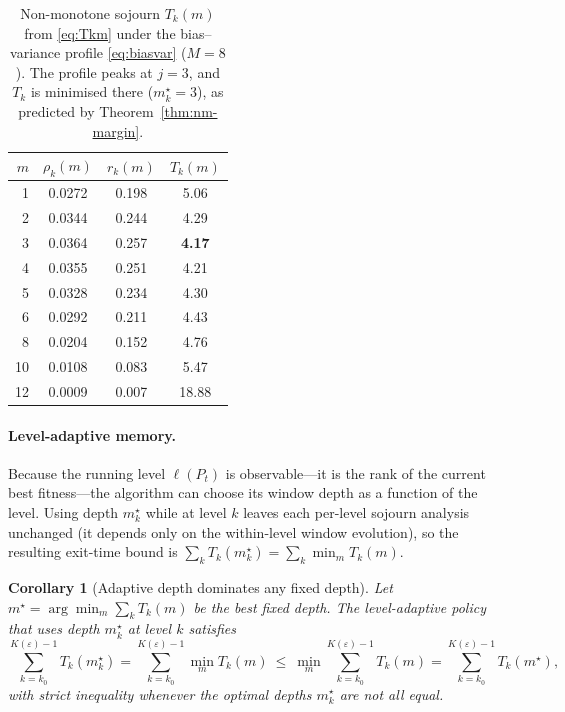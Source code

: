 \documentclass[11pt,a4paper]{article}
\newtheorem{corollary}[theorem]{Corollary}
\begin{document}
\begin{table}[ht]
\centering
\caption{Non-monotone sojourn $T_k(m)$ from \eqref{eq:Tkm} under the
  bias--variance profile \eqref{eq:biasvar} ($M=8$).  The profile peaks
  at $j=3$, and $T_k$ is minimised there ($m_k^\star=3$), as predicted by
  Theorem~\ref{thm:nm-margin}.}
\label{tab:nm-example}
\renewcommand{\arraystretch}{1.2}
\begin{tabular}{@{}rccc@{}}
\toprule
$m$ & $\rho_k(m)$ & $r_k(m)$ & $T_k(m)$ \\
\midrule
1  & 0.0272 & 0.198 & 5.06 \\
2  & 0.0344 & 0.244 & 4.29 \\
3  & 0.0364 & 0.257 & \textbf{4.17} \\
4  & 0.0355 & 0.251 & 4.21 \\
5  & 0.0328 & 0.234 & 4.30 \\
6  & 0.0292 & 0.211 & 4.43 \\
8  & 0.0204 & 0.152 & 4.76 \\
10 & 0.0108 & 0.083 & 5.47 \\
12 & 0.0009 & 0.007 & 18.88 \\
\bottomrule
\end{tabular}
\end{table}

\paragraph{Level-adaptive memory.}

Because the running level $\ell(P_t)$ is observable---it is the rank of
the current best fitness---the algorithm can choose its window depth as
a function of the level.  Using depth $m_k^\star$ while at level $k$
leaves each per-level sojourn analysis unchanged (it depends only on the
within-level window evolution), so the resulting exit-time bound is
$\sum_k T_k(m_k^\star)=\sum_k\min_m T_k(m)$.

\begin{corollary}[Adaptive depth dominates any fixed depth]
\label{cor:nm-adaptive}
  Let $m^\star=\arg\min_m\sum_k T_k(m)$ be the best fixed depth.  The
  level-adaptive policy that uses depth $m_k^\star$ at level $k$ satisfies
  \[
    \sum_{k=k_0}^{K(\varepsilon)-1}T_k(m_k^\star)
    =\sum_{k=k_0}^{K(\varepsilon)-1}\min_{m}T_k(m)
    \ \le\ \min_{m}\sum_{k=k_0}^{K(\varepsilon)-1}T_k(m)
    =\sum_{k=k_0}^{K(\varepsilon)-1}T_k(m^\star),
  \]
  with strict inequality whenever the optimal depths $m_k^\star$ are not
  all equal.
\end{corollary}
\end{document}
